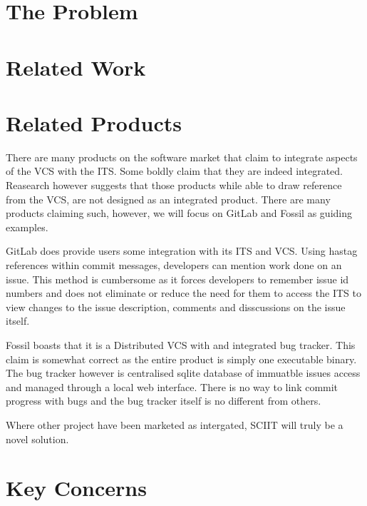 \documentclass{mproj}
\begin{document}

\section{The Problem}

\section{Related Work}  %


\section{Related Products}

There are many products on the software market that claim to integrate aspects of the VCS with the ITS. Some boldly claim that they are indeed integrated. Reasearch however suggests that those products while able to draw reference from the VCS, are not designed as an integrated product. There are many products claiming such, however, we will focus on GitLab and Fossil as guiding examples.

GitLab does provide users some integration with its ITS and VCS. Using hastag references within commit messages, developers can mention work done on an issue. This method is cumbersome as it forces developers to remember issue id numbers and does not eliminate or reduce the need for them to access the ITS to view changes to the issue description, comments and disscussions on the issue itself.

Fossil boasts that it is a Distributed VCS with and integrated bug tracker. This claim is somewhat correct as the entire product is simply one executable binary. The bug tracker however is centralised sqlite database of immuatble issues access and managed through a local web interface. There is no way to link commit progress with bugs and the bug tracker itself is no different from others.

Where other project have been marketed as intergated, SCIIT will truly be a novel solution. 

\section{Key Concerns}
\end{document}
